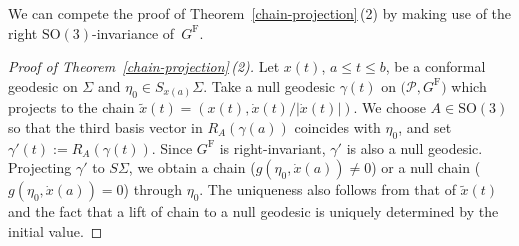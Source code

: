 \documentclass[11pt]{article}
\numberwithin{equation}{section}
\numberwithin{equation}{section}
\begin{document}
We can compete the proof of Theorem~\ref{chain-projection}\,(2) by making use of the right $\mathrm{SO}(3)$-invariance of~$G^{\mathrm{F}}$.

\begin{proof}[Proof of Theorem~\ref{chain-projection}\,(2)]
Let $x(t)$, $a\le t\le b$, be a conformal geodesic on $\Sigma$ and $\eta_0\in S_{x(a)}\Sigma$. Take a null geodesic $\gamma(t)$ on $\bigl(\mathcal{P}, G^{\mathrm{F}}\bigr)$ which projects to the chain $\tilde x(t)=(x(t), \dot x(t)/|\dot x(t)|)$.
We choose $A\in \mathrm{SO}(3)$ so that the third basis vector in $R_A(\gamma(a))$ coincides with $\eta_0$, and set $\gamma'(t):=R_A(\gamma(t))$. Since $G^{\mathrm{F}}$ is right-invariant, $\gamma'$ is also a null geodesic. Projecting $\gamma'$ to $S\Sigma$, we obtain a chain ($g(\eta_0, \dot x(a))\neq0$) or a null chain
 ($g(\eta_0, \dot x(a))=0$) through $\eta_0$. The uniqueness also follows from that of $\tilde x(t)$ and the fact that a lift of chain to a null geodesic is uniquely determined by the initial value.
\end{proof}
\end{document}
